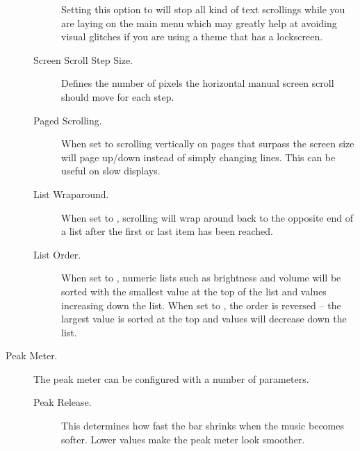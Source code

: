 \begin{description}
\begin{description}
      Setting this option to 
      will stop all kind of text scrollings while you are laying on the main menu
      which may greatly help at avoiding visual glitches if you are using a theme
      that has a lockscreen.
    \item[Screen Scroll Step Size.]
      Defines the number of pixels the horizontal manual screen scroll should move
      for each step.
    \item[Paged Scrolling.]
      When set to  scrolling vertically on pages that surpass the
      screen size will page up/down instead of simply changing lines. This can be
      useful on slow displays.
    \item[List Wraparound.]
      When set to , scrolling will wrap around back to the opposite
      end of a list after the first or last item has been reached.
    \item[List Order.]
      When set to , numeric lists such as brightness and
      volume will be sorted with the smallest value at the top of the list and
      values increasing down the list. When set to , the
      order is reversed -- the largest value is sorted at the top and values
      will decrease down the list.
    \end{description}
%
  \item[Peak Meter.]
    The peak meter can be configured with a number of parameters.
    \begin{description}
    \item[Peak Release.]
      This determines how fast the bar shrinks when the music becomes
      softer. Lower values make the peak meter look smoother.

\end{description}
\end{description}
